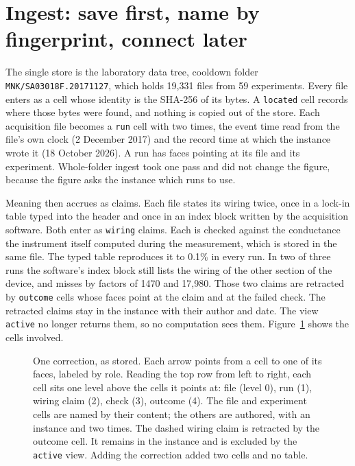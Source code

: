 \documentclass[11pt]{article}
\newcommand{\cellname}[1]{\texttt{#1}}
\begin{document}
\section{Ingest: save first, name by fingerprint, connect later}

The single store is the laboratory data tree, cooldown folder \texttt{MNK/SA03018F.20171127}, which holds 19,331 files from 59 experiments. Every file enters as a cell whose identity is the SHA-256 of its bytes. A \cellname{located} cell records where those bytes were found, and nothing is copied out of the store. Each acquisition file becomes a \cellname{run} cell with two times, the event time read from the file's own clock (2 December 2017) and the record time at which the instance wrote it (18 October 2026). A run has faces pointing at its file and its experiment. Whole-folder ingest took one pass and did not change the figure, because the figure asks the instance which runs to use.

Meaning then accrues as claims. Each file states its wiring twice, once in a lock-in table typed into the header and once in an index block written by the acquisition software. Both enter as \cellname{wiring} claims. Each is checked against the conductance the instrument itself computed during the measurement, which is stored in the same file. The typed table reproduces it to 0.1\% in every run. In two of three runs the software's index block still lists the wiring of the other section of the device, and misses by factors of 1470 and 17,980. Those two claims are retracted by \cellname{outcome} cells whose faces point at the claim and at the failed check. The retracted claims stay in the instance with their author and date. The view \cellname{active} no longer returns them, so no computation sees them. Figure~\ref{fig:tower} shows the cells involved.

\begin{figure}[h]
\centering
\vspace{1em}
\caption{One correction, as stored. Each arrow points from a cell to one of its faces, labeled by role. Reading the top row from left to right, each cell sits one level above the cells it points at: file (level 0), run (1), wiring claim (2), check (3), outcome (4). The file and experiment cells are named by their content; the others are authored, with an instance and two times. The dashed wiring claim is retracted by the outcome cell. It remains in the instance and is excluded by the \cellname{active} view. Adding the correction added two cells and no table.}
\label{fig:tower}
\end{figure}
\end{document}

